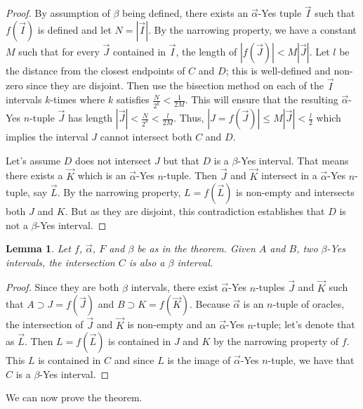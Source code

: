 \documentclass[12pt]{article}
\newtheorem{lemma}{Lemma}
\theoremstyle{remark}
\begin{document}
\begin{proof}
By assumption of $\beta$ being defined, there exists an $\vec{\alpha}$-Yes tuple $\vec{I}$ such that $f(\vec{I})$ is defined and let $N =|\vec{I}|$. By the narrowing property, we have a constant $M$ such that for every $\vec{J}$ contained in $\vec{I}$, the length of $|f(\vec{J})| < M |\vec{J}|$. Let $l$ be the distance from the closest endpoints of $C$ and $D$; this is well-defined and non-zero since they are disjoint. Then use the bisection method on each of the $\vec{I}$ intervals $k$-times where $k$ satisfies $\frac{N}{2^k} < \frac{1}{2M}$. This will ensure that the resulting $\vec{\alpha}$-Yes $n$-tuple $\vec{J}$ has length $|\vec{J}| < \frac{N}{2^{k}} < \frac{l}{2M}$. Thus, $|J = f(\vec{J})| \leq M |\vec{J}| < \frac{l}{2}$ which implies the interval $J$ cannot intersect both $C$ and $D$. 

Let's assume $D$ does not intersect $J$ but that $D$ is a $\beta$-Yes interval. That means there exists a $\vec{K}$ which is an $\vec{\alpha}$-Yes $n$-tuple. Then $\vec{J}$ and $\vec{K}$ intersect in a $\vec{\alpha}$-Yes $n$-tuple, say $\vec{L}$. By the narrowing property, $L = f(\vec{L})$ is non-empty and intersects both $J$ and $K$. But as they are disjoint, this contradiction establishes that $D$ is not a $\beta$-Yes interval. 
\end{proof}

\begin{lemma}
Let $f$, $\vec{\alpha}$, $F$ and $\beta$ be as in the theorem. Given $A$ and $B$, two $\beta$-Yes intervals, the intersection $C$ is also a $\beta$ interval. 
\end{lemma}

\begin{proof}
Since they are both $\beta$ intervals, there exist $\vec{\alpha}$-Yes $n$-tuples $\vec{J}$ and $\vec{K}$ such that $A \supset J = f(\vec{J})$ and $B \supset K= f(\vec{K})$. Because $\vec{\alpha}$ is an $n$-tuple of oracles, the intersection of $\vec{J}$ and $\vec{K}$ is non-empty and an $\vec{\alpha}$-Yes $n$-tuple; let's denote that as $\vec{L}$. Then $L = f(\vec{L})$ is contained in $J$ and $K$ by the narrowing property of $f$. This $L$ is contained in $C$ and since $L$ is the image of $\vec{\alpha}$-Yes $n$-tuple, we have that $C$ is a $\beta$-Yes interval. 
\end{proof}

We can now prove the theorem. 
\end{document}
